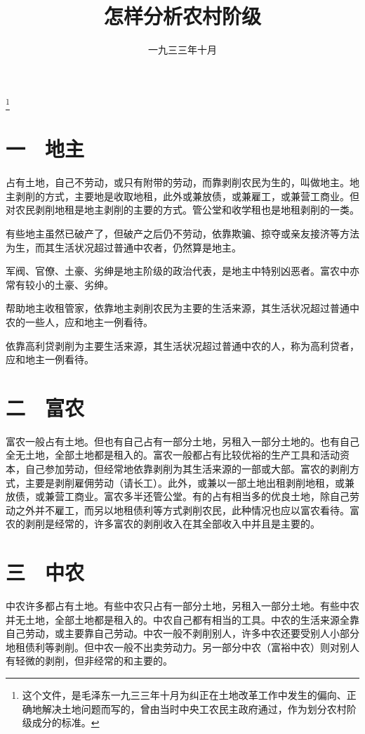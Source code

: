 
\title{怎样分析农村阶级}
\date{一九三三年十月}
\thanks{这个文件，是毛泽东一九三三年十月为纠正在土地改革工作中发生的偏向、正确地解决土地问题而写的，曾由当时中央工农民主政府通过，作为划分农村阶级成分的标准。}
\maketitle


\section{一　地主}

占有土地，自己不劳动，或只有附带的劳动，而靠剥削农民为生的，叫做地主。地主剥削的方式，主要地是收取地租，此外或兼放债，或兼雇工，或兼营工商业。但对农民剥削地租是地主剥削的主要的方式。管公堂和收学租也是地租剥削的一类。

有些地主虽然已破产了，但破产之后仍不劳动，依靠欺骗、掠夺或亲友接济等方法为生，而其生活状况超过普通中农者，仍然算是地主。

军阀、官僚、土豪、劣绅是地主阶级的政治代表，是地主中特别凶恶者。富农中亦常有较小的土豪、劣绅。

帮助地主收租管家，依靠地主剥削农民为主要的生活来源，其生活状况超过普通中农的一些人，应和地主一例看待。

依靠高利贷剥削为主要生活来源，其生活状况超过普通中农的人，称为高利贷者，应和地主一例看待。

\section{二　富农}

富农一般占有土地。但也有自己占有一部分土地，另租入一部分土地的。也有自己全无土地，全部土地都是租入的。富农一般都占有比较优裕的生产工具和活动资本，自己参加劳动，但经常地依靠剥削为其生活来源的一部或大部。富农的剥削方式，主要是剥削雇佣劳动（请长工）。此外，或兼以一部土地出租剥削地租，或兼放债，或兼营工商业。富农多半还管公堂。有的占有相当多的优良土地，除自己劳动之外并不雇工，而另以地租债利等方式剥削农民，此种情况也应以富农看待。富农的剥削是经常的，许多富农的剥削收入在其全部收入中并且是主要的。

\section{三　中农}

中农许多都占有土地。有些中农只占有一部分土地，另租入一部分土地。有些中农并无土地，全部土地都是租入的。中农自己都有相当的工具。中农的生活来源全靠自己劳动，或主要靠自己劳动。中农一般不剥削别人，许多中农还要受别人小部分地租债利等剥削。但中农一般不出卖劳动力。另一部分中农（富裕中农）则对别人有轻微的剥削，但非经常的和主要的。

